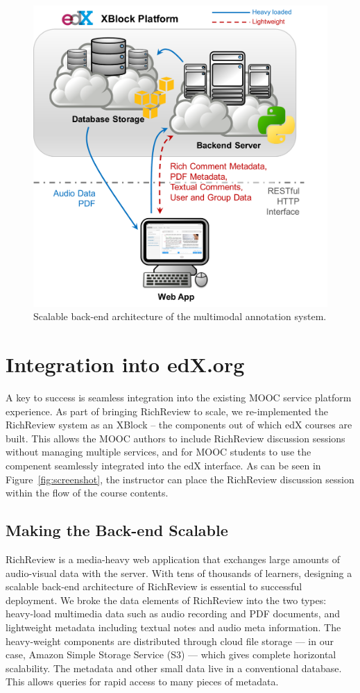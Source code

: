 \documentclass{sigchi}
\begin{document}
\begin{figure}[!h]
\centering
\includegraphics[width=0.95\columnwidth]{figure_architecture}
\caption{Scalable back-end architecture of the multimodal annotation system.}
\label{fig:figure2}
\end{figure}

\section{Integration into edX.org} 

A key to success is seamless integration into the existing MOOC service platform experience.
As part of bringing RichReview to scale, we re-implemented the RichReview system as an XBlock -- the components out of which edX courses are built.
This allows the MOOC authors to include RichReview discussion sessions without managing multiple services, and for MOOC students to use the compenent seamlessly integrated into the edX interface.
As can be seen in Figure~\ref{fig:screenshot}, the instructor can place the RichReview discussion session within the flow of the course contents.

\subsection{Making the Back-end Scalable}
RichReview is a media-heavy web application that exchanges large amounts of audio-visual data with the server.
With tens of thousands of learners, designing a scalable back-end architecture of RichReview is essential to successful deployment.
We broke the data elements of RichReview into the two types: heavy-load multimedia data such as audio recording and PDF documents, and lightweight metadata including textual notes and audio meta information.
The heavy-weight components are distributed through cloud file storage --- in our case, Amazon Simple Storage Service (S3) --- which gives complete horizontal scalability. The metadata and other small data live in a conventional database. This allows queries for rapid access to many pieces of metadata.
\end{document}
